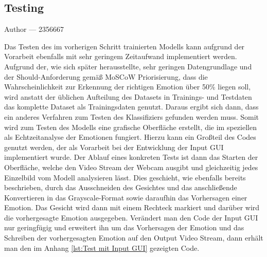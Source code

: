 \documentclass[12pt, a4paper]{report}
\makeatletter
\newcommand{\sectionauthor}[1]{%
  {\parindent0pt\vspace*{-5pt}%
  \large{Author --- }
  \linespread{1.1}\large\scshape#1%
  \par\nobreak\vspace*{35pt} }
  \@afterheading%
}
\makeatother
\begin{document}
\subsection{Testing}
\sectionauthor{2356667}
Das Testen des im vorherigen Schritt trainierten Modells kann aufgrund der Vorarbeit ebenfalls mit sehr geringem Zeitaufwand implementiert werden. Aufgrund der, wie sich später herausstellte, sehr geringen Datengrundlage und der Should-Anforderung gemäß MoSCoW Priorisierung, dass die Wahrscheinlichkeit zur Erkennung der richtigen Emotion über 50\% liegen soll, wird anstatt der üblichen Aufteilung des Datasets in Trainings- und Testdaten das komplette Dataset als Trainingsdaten genutzt. Daraus ergibt sich dann, dass ein anderes Verfahren zum Testen des Klassifiziers gefunden werden muss. Somit wird zum Testen des Modells eine grafische Oberfläche erstellt, die im speziellen als Echtzeitanalyse der Emotionen fungiert. Hierzu kann ein Großteil des Codes genutzt werden, der als Vorarbeit bei der Entwicklung der Input GUI implementiert wurde. Der Ablauf eines konkreten Tests ist dann das Starten der Oberfläche, welche den Video Stream der Webcam ausgibt und gleichzeitig jedes Einzelbild vom Modell analysieren lässt. Dies geschieht, wie ebenfalls bereits beschrieben, durch das Ausschneiden des Gesichtes und das anschließende Konvertieren in das Grayscale-Format sowie daraufhin das Vorhersagen einer Emotion. Das Gesicht wird dann mit einem Rechteck markiert und darüber wird die vorhergesagte Emotion ausgegeben. Verändert man den Code der Input GUI nur geringfügig und erweitert ihn um das Vorhersagen der Emotion und das Schreiben der vorhergesagten Emotion auf den Output Video Stream, dann erhält man den im Anhang \ref{lst:Test mit Input GUI} gezeigten Code.
\end{document}
